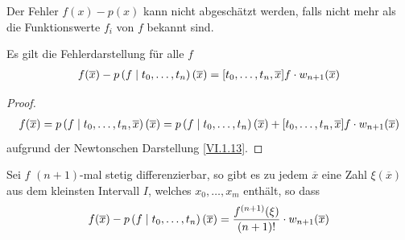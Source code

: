 Der Fehler $f(x) -p(x) $ kann nicht abgeschätzt werden,
falls nicht mehr als die Funktionswerte $f_i$ von $f$ bekannt sind.

\begin{Satze}
  Es gilt die Fehlerdarstellung für alle $f$
  \begin{gather}
    f(\overline{x})-p\left( f \mid t_0,\dotsc,t_n \right)(\overline{x})
    = [t_0,\dotsc,t_n,\overline{x}]f\cdot w_{n+1}(\overline{x})
    \label{VI.1.22}
  \end{gather}
\end{Satze}

\begin{proof}
  \begin{gather*}
    f(\overline{x})
    = p\left( f \mid t_0,\dotsc,t_n,\overline{x} \right)(\overline{x})
    = p\left( f \mid t_0,\dotsc,t_n \right)(\overline{x})
    + [t_0,\dotsc,t_n,\overline{x}]f\cdot w_{n+1}(\overline{x})
  \end{gather*}
  aufgrund der Newtonschen Darstellung \eqref{VI.1.13}.
\end{proof}


\begin{Satze}[Restglieddarstellung]
  Sei $f$ $(n+1)$-mal stetig differenzierbar,
  so gibt es zu jedem $\overline{x}$ eine Zahl $\xi(\overline{x})$
  aus dem kleinsten Intervall $I$, welches $x_0,\dotsc, x_m$ enthält,
  so dass 
  \begin{gather}
    f(\overline{x})-p\left( f \mid t_0,\dotsc,t_n \right)(\overline{x})
    = \frac{f^{(n+1)}(\xi)}{(n+1)!}\cdot w_{n+1}(\overline{x})
    \label{VI.1.21}
  \end{gather}
\end{Satze}

